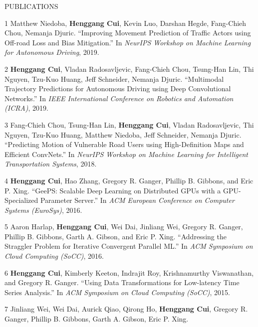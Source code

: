 \documentclass{resume} %
\begin{document}
\begin{rSection}{PUBLICATIONS}
\vspace{-.1in}
\small{
    \item
    [1]
        Matthew Niedoba, {\bf Henggang Cui}, Kevin Luo, Darshan Hegde, Fang-Chieh Chou, Nemanja Djuric.
        ``Improving Movement Prediction of Traffic Actors using Off-road Loss and Bias Mitigation.''
        In \emph{NeurIPS Workshop on Machine Learning for Autonomous Driving}, 2019.
    \item
    [2]
        {\bf Henggang Cui}, Vladan Radosavljevic, Fang-Chieh Chou, Tsung-Han Lin, Thi Nguyen, Tzu-Kuo Huang, Jeff Schneider, Nemanja Djuric.
        ``Multimodal Trajectory Predictions for Autonomous Driving using Deep Convolutional Networks.''
        In \emph{IEEE International Conference on Robotics and Automation (ICRA)}, 2019.
    \item
    [3]
        Fang-Chieh Chou, Tsung-Han Lin, {\bf Henggang Cui}, Vladan Radosavljevic, Thi Nguyen, Tzu-Kuo Huang, Matthew Niedoba, Jeff Schneider, Nemanja Djuric.
        ``Predicting Motion of Vulnerable Road Users using High-Definition Maps and Efficient ConvNets.''
        In \emph{NeurIPS Workshop on Machine Learning for Intelligent Transportation Systems}, 2018.
    \item
    [4]
        {\bf Henggang Cui}, Hao Zhang, Gregory R. Ganger, Phillip B. Gibbons, and Eric P. Xing.
        ``GeePS: Scalable Deep Learning on Distributed GPUs with a GPU-Specialized Parameter Server.''
        In \emph{ACM European Conference on Computer Systems (EuroSys)}, 2016.
    \item
    [5]
        Aaron Harlap, {\bf Henggang Cui}, Wei Dai, Jinliang Wei, Gregory R. Ganger, Phillip B. Gibbons, Garth A. Gibson, and Eric P. Xing.
        ``Addressing the Straggler Problem for Iterative Convergent Parallel ML.''
        In \emph{ACM Symposium on Cloud Computing (SoCC)}, 2016.
    \item
    [6]
        {\bf Henggang Cui}, Kimberly Keeton, Indrajit Roy, Krishnamurthy Viswanathan, and Gregory R. Ganger.
        ``Using Data Transformations for Low-latency Time Series Analysis.''
        In \emph{ACM Symposium on Cloud Computing (SoCC)}, 2015.
    \item
    [7]
        Jinliang Wei, Wei Dai, Aurick Qiao, Qirong Ho, {\bf Henggang Cui}, Gregory R. Ganger, Phillip B. Gibbons, Garth A. Gibson, Eric P. Xing.
}
\end{rSection}
\end{document}
